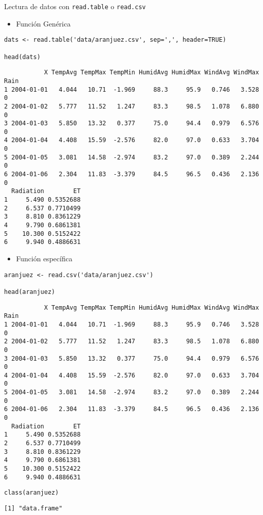 \documentclass[xcolor={usenames,svgnames,dvipsnames}]{beamer}
\begin{document}
\begin{frame}[label={sec:orgec6be94},fragile]{Lectura de datos con \texttt{read.table} o \texttt{read.csv}}
 \begin{itemize}
\item Función Genérica
\end{itemize}
\lstset{language=r,label= ,caption= ,captionpos=b,numbers=none}
\begin{lstlisting}
dats <- read.table('data/aranjuez.csv', sep=',', header=TRUE)

head(dats)
\end{lstlisting}

\begin{verbatim}
           X TempAvg TempMax TempMin HumidAvg HumidMax WindAvg WindMax Rain
1 2004-01-01   4.044   10.71  -1.969     88.3     95.9   0.746   3.528    0
2 2004-01-02   5.777   11.52   1.247     83.3     98.5   1.078   6.880    0
3 2004-01-03   5.850   13.32   0.377     75.0     94.4   0.979   6.576    0
4 2004-01-04   4.408   15.59  -2.576     82.0     97.0   0.633   3.704    0
5 2004-01-05   3.081   14.58  -2.974     83.2     97.0   0.389   2.244    0
6 2004-01-06   2.304   11.83  -3.379     84.5     96.5   0.436   2.136    0
  Radiation        ET
1     5.490 0.5352688
2     6.537 0.7710499
3     8.810 0.8361229
4     9.790 0.6861381
5    10.300 0.5152422
6     9.940 0.4886631
\end{verbatim}

\begin{itemize}
\item Función específica
\end{itemize}
\lstset{language=r,label= ,caption= ,captionpos=b,numbers=none}
\begin{lstlisting}
aranjuez <- read.csv('data/aranjuez.csv')

head(aranjuez)
\end{lstlisting}

\begin{verbatim}
           X TempAvg TempMax TempMin HumidAvg HumidMax WindAvg WindMax Rain
1 2004-01-01   4.044   10.71  -1.969     88.3     95.9   0.746   3.528    0
2 2004-01-02   5.777   11.52   1.247     83.3     98.5   1.078   6.880    0
3 2004-01-03   5.850   13.32   0.377     75.0     94.4   0.979   6.576    0
4 2004-01-04   4.408   15.59  -2.576     82.0     97.0   0.633   3.704    0
5 2004-01-05   3.081   14.58  -2.974     83.2     97.0   0.389   2.244    0
6 2004-01-06   2.304   11.83  -3.379     84.5     96.5   0.436   2.136    0
  Radiation        ET
1     5.490 0.5352688
2     6.537 0.7710499
3     8.810 0.8361229
4     9.790 0.6861381
5    10.300 0.5152422
6     9.940 0.4886631
\end{verbatim}

\lstset{language=r,label= ,caption= ,captionpos=b,numbers=none}
\begin{lstlisting}
class(aranjuez)
\end{lstlisting}

\begin{verbatim}
[1] "data.frame"
\end{verbatim}
\end{frame}
\end{document}
